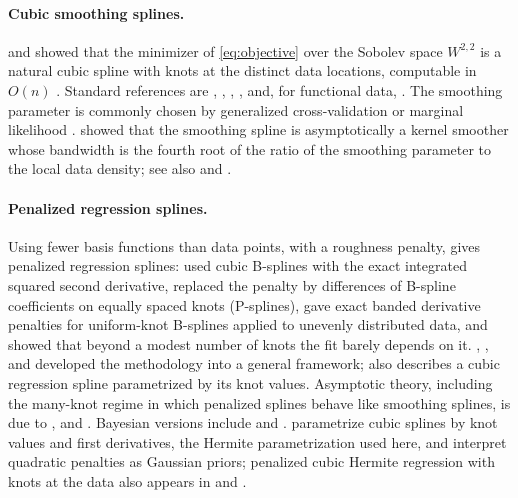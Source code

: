 \documentclass[11pt,a4paper]{article}
\theoremstyle{definition}
\theoremstyle{remark}
\begin{document}
\paragraph{Cubic smoothing splines.} \citet{Schoenberg1964} and \citet{Reinsch1967} showed that the minimizer of \eqref{eq:objective} over the Sobolev space $W^{2,2}$ is a natural cubic spline with knots at the distinct data locations, computable in $O(n)$ \citep{Reinsch1967,HutchinsonDeHoog1985,DeHoogHutchinson1987,Weinert2009}. Standard references are \citet{Wahba1990}, \citet{GreenSilverman1994}, \citet{Eubank1999}, \citet{deBoor1978}, \citet{Dierckx1993} and, for functional data, \citet{RamsaySilverman2005}. The smoothing parameter is commonly chosen by generalized cross-validation \citep{CravenWahba1979,Silverman1984cv} or marginal likelihood \citep{Wahba1985,Wood2011}. \citet{Silverman1984} showed that the smoothing spline is asymptotically a kernel smoother whose bandwidth is the fourth root of the ratio of the smoothing parameter to the local data density; see also \citet{Silverman1985} and \citet{Nychka1995}.

\paragraph{Penalized regression splines.} Using fewer basis functions than data points, with a roughness penalty, gives penalized regression splines: \citet{OSullivan1986} used cubic B-splines with the exact integrated squared second derivative, \citet{EilersMarx1996,EilersMarx2010} replaced the penalty by differences of B-spline coefficients on equally spaced knots (P-splines), \citet{Wood2017ps} gave exact banded derivative penalties for uniform-knot B-splines applied to unevenly distributed data, and \citet{Ruppert2002} showed that beyond a modest number of knots the fit barely depends on it. \citet{RuppertWandCarroll2003}, \citet{Wand2003}, \citet{WandOrmerod2008} and \citet{Wood2003,Wood2017} developed the methodology into a general framework; \citet{Wood2017} also describes a cubic regression spline parametrized by its knot values. Asymptotic theory, including the many-knot regime in which penalized splines behave like smoothing splines, is due to \citet{HallOpsomer2005}, \citet{LiRuppert2008} and \citet{ClaeskensKrivobokovaOpsomer2009}. Bayesian versions include \citet{LangBrezger2004} and \citet{SpeckmanSun2003}. \citet{CostaShaw2009} parametrize cubic splines by knot values and first derivatives, the Hermite parametrization used here, and interpret quadratic penalties as Gaussian priors; penalized cubic Hermite regression with knots at the data also appears in \citet{CaoEtAl2021} and \citet{CampagnaCotroneiFazzino2025}.
\end{document}

